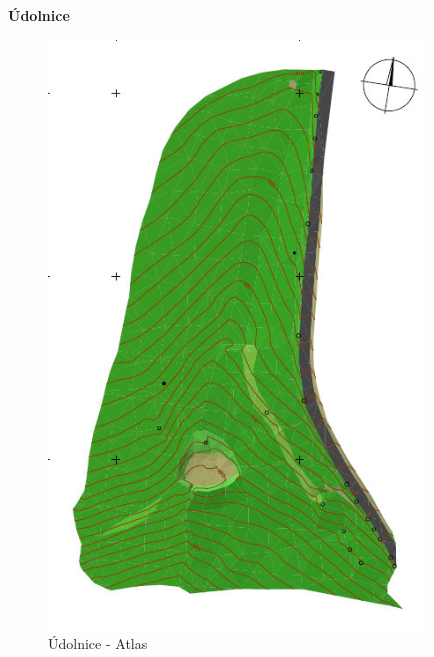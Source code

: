 \documentclass[a4paper, 12pt]{article}
\begin{document}
\textbf{Údolnice}
\begin{figure}[h]
	\centering
	\includegraphics[width=10cm]{dmt_atlas.jpg}
	\caption{Údolnice - Atlas}
\end{figure}
\end{document}
